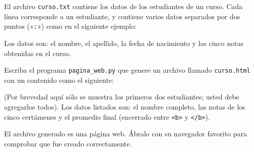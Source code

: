 \lstset{language=file,frame=single}

El archivo \texttt{curso.txt} contiene los datos
de los estudiantes de un curso.
Cada línea corres\-ponde a un estudiante,
y contiene varios datos separados por dos puntos («\verb+:+»)
como en el si\-guiente ejemplo:


Los datos son:
el nombre, el apellido, la fecha de nacimiento
y las cinco notas obtenidas en el curso.

Escriba el programa \texttt{pagina\_web.py}
que genere un archivo llamado \texttt{curso.html}
con un contenido como el siguiente:

(Por brevedad aquí sólo se muestra los primeros dos estu\-diantes;
usted debe agregarlos todos).
Los datos listados son:
el nombre completo,
las notas de los cinco certámenes
y el promedio final (encerrado entre \verb+<b>+ y \verb+</b>+).

El archivo generado es una página web.
Ábralo con su nave\-gador favorito
para comprobar que fue creado correctamente.
